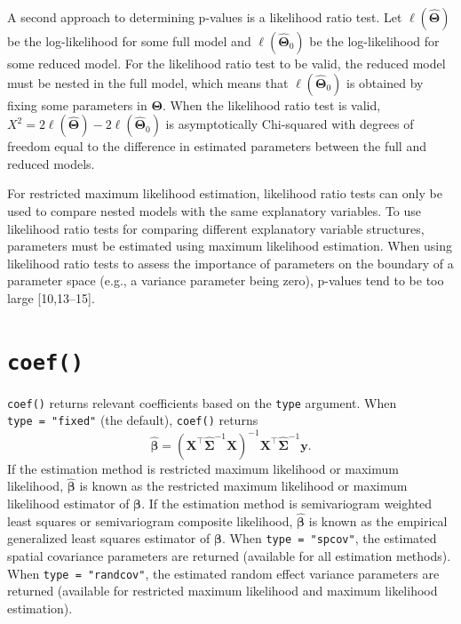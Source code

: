 \documentclass[10pt,letterpaper]{article}
\begin{document}
A second approach to determining p-values is a likelihood ratio test.
Let \(\ell(\boldsymbol{\hat{\Theta}})\) be the log-likelihood for some
full model and \(\ell(\boldsymbol{\hat{\Theta}}_0)\) be the
log-likelihood for some reduced model. For the likelihood ratio test to
be valid, the reduced model must be nested in the full model, which
means that \(\ell(\boldsymbol{\hat{\Theta}}_0)\) is obtained by fixing
some parameters in \(\boldsymbol{\Theta}\). When the likelihood ratio
test is valid,
\(X^2 = 2\ell(\boldsymbol{\hat{\Theta}}) - 2\ell(\boldsymbol{\hat{\Theta}}_0)\)
is asymptotically Chi-squared with degrees of freedom equal to the
difference in estimated parameters between the full and reduced models.

For restricted maximum likelihood estimation, likelihood ratio tests can
only be used to compare nested models with the same explanatory
variables. To use likelihood ratio tests for comparing different
explanatory variable structures, parameters must be estimated using
maximum likelihood estimation. When using likelihood ratio tests to
assess the importance of parameters on the boundary of a parameter space
(e.g., a variance parameter being zero), p-values tend to be too large
{[}10,13--15{]}.

\hypertarget{sec:coef}{%
\section{\texorpdfstring{\texttt{coef()}}{coef()}}\label{sec:coef}}

\texttt{coef()} returns relevant coefficients based on the \texttt{type}
argument. When \texttt{type\ =\ "fixed"} (the default), \texttt{coef()}
returns \begin{equation*}
\hat{\boldsymbol{\beta}} = (\mathbf{X}^\top \hat{\boldsymbol{\Sigma}}^{-1} \mathbf{X})^{-1}\mathbf{X}^\top \hat{\boldsymbol{\Sigma}}^{-1} \mathbf{y} .
\end{equation*} If the estimation method is restricted maximum
likelihood or maximum likelihood, \(\hat{\boldsymbol{\beta}}\) is known
as the restricted maximum likelihood or maximum likelihood estimator of
\(\boldsymbol{\beta}\). If the estimation method is semivariogram
weighted least squares or semivariogram composite likelihood,
\(\hat{\boldsymbol{\beta}}\) is known as the empirical generalized least
squares estimator of \(\boldsymbol{\beta}\). When
\texttt{type\ =\ "spcov"}, the estimated spatial covariance parameters
are returned (available for all estimation methods). When
\texttt{type\ =\ "randcov"}, the estimated random effect variance
parameters are returned (available for restricted maximum likelihood and
maximum likelihood estimation).
\end{document}
